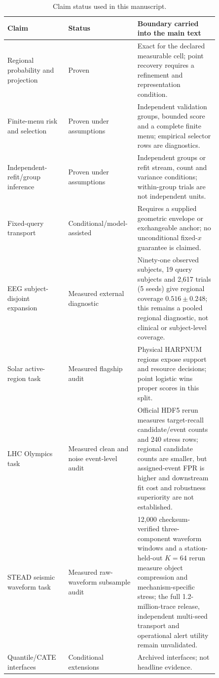 \documentclass[11pt,a4paper]{article}
\numberwithin{equation}{section}
\theoremstyle{definition}\newtheorem{definition}[theorem]{Definition}
\theoremstyle{remark}\newtheorem{remark}[theorem]{Remark}
\begin{document}
\begin{table}[ht]
\centering\small
\caption{Claim status used in this manuscript.}
\begin{tabular}{L{0.27\linewidth}L{0.22\linewidth}L{0.36\linewidth}}
\toprule
Claim & Status & Boundary carried into the main text \\
\midrule
Regional probability and projection & Proven & Exact for the declared measurable cell; point recovery requires a refinement and representation condition.\\
Finite-menu risk and selection & Proven under assumptions & Independent validation groups, bounded score and a complete finite menu; empirical selector rows are diagnostics.\\
Independent-refit/group inference & Proven under assumptions & Independent groups or refit stream, count and variance conditions; within-group trials are not independent units.\\
Fixed-query transport & Conditional/model-assisted & Requires a supplied geometric envelope or exchangeable anchor; no unconditional fixed-$x$ guarantee is claimed.\\
EEG subject-disjoint expansion & Measured external diagnostic & Ninety-one observed subjects, 19 query subjects and 2,617 trials (5 seeds) give regional coverage $0.516\pm0.248$; this remains a pooled regional diagnostic, not clinical or subject-level coverage.\\
Solar active-region task & Measured flagship audit & Physical HARPNUM regions expose support and resource decisions; point logistic wins proper scores in this split.\\
LHC Olympics task & Measured clean and noise event-level audit & Official HDF5 rerun measures target-recall candidate/event counts and 240 stress rows; regional candidate counts are smaller, but assigned-event FPR is higher and downstream fit cost and robustness superiority are not established.\\
STEAD seismic waveform task & Measured raw-waveform subsample audit & 12,000 checksum-verified three-component waveform windows and a station-held-out $K=64$ rerun measure object compression and mechanism-specific stress; the full 1.2-million-trace release, independent multi-seed transport and operational alert utility remain unvalidated.\\
Quantile/CATE interfaces & Conditional extensions & Archived interfaces; not headline evidence.\\
\bottomrule
\end{tabular}
\end{table}
\end{document}
